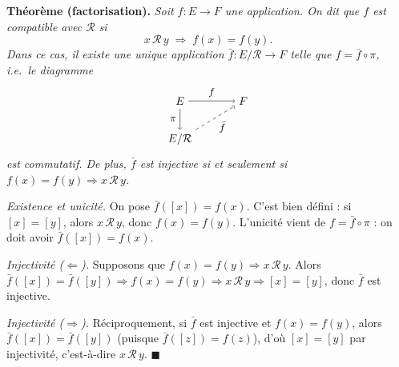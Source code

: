 
\begin{tcolorbox}[thmbox]
  \textbf{Théorème (factorisation).}\enspace%
  \textit{Soit $f : E \to F$ une application. On dit que $f$ est
  \emph{compatible} avec $\mathcal{R}$ si}
  \[
    x\,\mathcal{R}\,y \;\Rightarrow\; f(x) = f(y).
  \]
  \textit{Dans ce cas, il existe une unique application
  $\bar{f} : E/\mathcal{R} \to F$ telle que $f = \bar{f} \circ \pi$,
  i.e.\ le diagramme}
  \[
    \begin{tikzpicture}[baseline=(current bounding box.center)]
      \node (E)  at (0,1)  {$E$};
      \node (F)  at (2,1)  {$F$};
      \node (Q)  at (0,-0.2) {$E/\mathcal{R}$};
      \draw[->] (E) -- node[above]{\small$f$} (F);
      \draw[->] (E) -- node[left]{\small$\pi$} (Q);
      \draw[->, dashed] (Q) -- node[below right]{\small$\bar{f}$} (F);
    \end{tikzpicture}
  \]
  \textit{est commutatif. De plus, $\bar{f}$ est injective si et seulement si
  $f(x)=f(y) \Rightarrow x\,\mathcal{R}\,y$.}
\end{tcolorbox}

\begin{mdframed}[style=proofbar]
  \textit{Existence et unicité.} On pose $\bar{f}([x]) = f(x)$.
  C'est bien défini : si $[x]=[y]$, alors $x\,\mathcal{R}\,y$, donc $f(x)=f(y)$.
  L'unicité vient de $f = \bar{f}\circ\pi$ : on doit avoir $\bar{f}([x]) = f(x)$.

  \textit{Injectivité ($\Leftarrow$).} Supposons que $f(x)=f(y)\Rightarrow x\,\mathcal{R}\,y$.
  Alors $\bar{f}([x])=\bar{f}([y]) \Rightarrow f(x)=f(y)
  \Rightarrow x\,\mathcal{R}\,y \Rightarrow [x]=[y]$, donc $\bar{f}$ est injective.

  \textit{Injectivité ($\Rightarrow$).} Réciproquement, si $\bar{f}$ est injective
  et $f(x)=f(y)$, alors $\bar{f}([x])=\bar{f}([y])$ (puisque $\bar{f}([z])=f(z)$),
  d'où $[x]=[y]$ par injectivité, c'est-à-dire $x\,\mathcal{R}\,y$. \hfill$\blacksquare$
\end{mdframed}

\decsep{}


